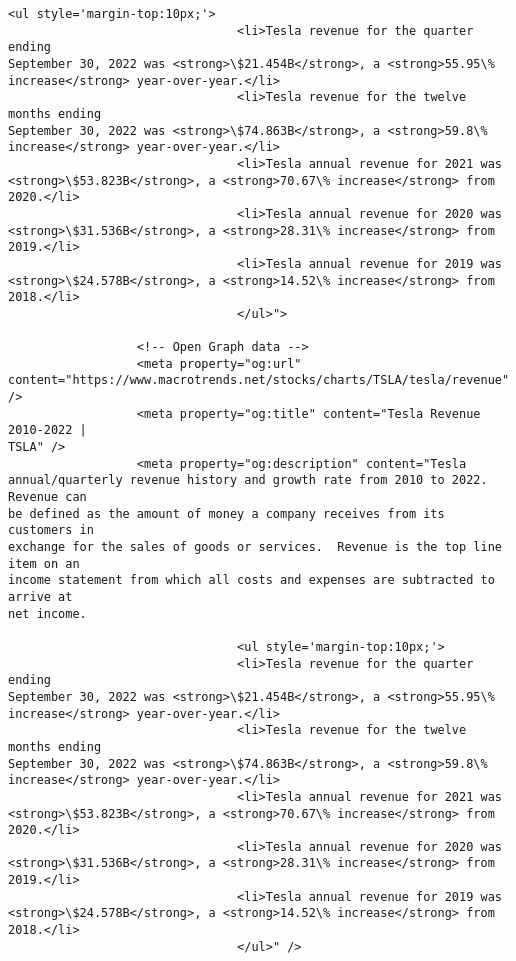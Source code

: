 \documentclass[11pt]{article}
\begin{document}
\begin{Verbatim}[commandchars=\\\{\}]
                                <ul style='margin-top:10px;'>
                                <li>Tesla revenue for the quarter ending
September 30, 2022 was <strong>\$21.454B</strong>, a <strong>55.95\%
increase</strong> year-over-year.</li>
                                <li>Tesla revenue for the twelve months ending
September 30, 2022 was <strong>\$74.863B</strong>, a <strong>59.8\%
increase</strong> year-over-year.</li>
                                <li>Tesla annual revenue for 2021 was
<strong>\$53.823B</strong>, a <strong>70.67\% increase</strong> from 2020.</li>
                                <li>Tesla annual revenue for 2020 was
<strong>\$31.536B</strong>, a <strong>28.31\% increase</strong> from 2019.</li>
                                <li>Tesla annual revenue for 2019 was
<strong>\$24.578B</strong>, a <strong>14.52\% increase</strong> from 2018.</li>
                                </ul>">

                  <!-- Open Graph data -->
                  <meta property="og:url"
content="https://www.macrotrends.net/stocks/charts/TSLA/tesla/revenue" />
                  <meta property="og:title" content="Tesla Revenue 2010-2022 |
TSLA" />
                  <meta property="og:description" content="Tesla
annual/quarterly revenue history and growth rate from 2010 to 2022. Revenue can
be defined as the amount of money a company receives from its customers in
exchange for the sales of goods or services.  Revenue is the top line item on an
income statement from which all costs and expenses are subtracted to arrive at
net income.

                                <ul style='margin-top:10px;'>
                                <li>Tesla revenue for the quarter ending
September 30, 2022 was <strong>\$21.454B</strong>, a <strong>55.95\%
increase</strong> year-over-year.</li>
                                <li>Tesla revenue for the twelve months ending
September 30, 2022 was <strong>\$74.863B</strong>, a <strong>59.8\%
increase</strong> year-over-year.</li>
                                <li>Tesla annual revenue for 2021 was
<strong>\$53.823B</strong>, a <strong>70.67\% increase</strong> from 2020.</li>
                                <li>Tesla annual revenue for 2020 was
<strong>\$31.536B</strong>, a <strong>28.31\% increase</strong> from 2019.</li>
                                <li>Tesla annual revenue for 2019 was
<strong>\$24.578B</strong>, a <strong>14.52\% increase</strong> from 2018.</li>
                                </ul>" />


\end{Verbatim}
\end{document}
